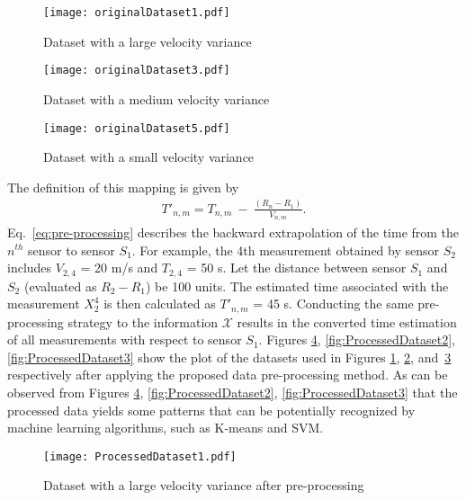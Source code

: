 \documentclass[letterpaper, 10 pt, conference]{ieeeconf}
\begin{document}
\begin{figure}[h!]
\centering
\captionsetup{justification=centering}
\texttt{[image: originalDataset1.pdf]}
\caption{Dataset with a large velocity variance}
\label{fig:firstDataset}
\end{figure}

\begin{figure}[h!]
\centering
\captionsetup{justification=centering}
\texttt{[image: originalDataset3.pdf]}
\caption{Dataset with a medium velocity variance}
\label{fig:secondDataset}
\end{figure}
\begin{figure}[h!]
\centering
\captionsetup{justification=centering}
\texttt{[image: originalDataset5.pdf]}
\caption{Dataset with a small velocity variance}
\label{fig:thirdDataset}
\end{figure}

The definition of this mapping is given by
\begin{align} \label{eq:pre-processing} 
{T'}_{n,m} =T_{n,m} ~-~ \frac{(R_n-R_1)}{V_{n,m}}.
\end{align}
Eq.~\ref{eq:pre-processing} describes the backward extrapolation of the time from the $n^{th}$ sensor to sensor $S_1$. For example, the 4th measurement obtained by sensor $S_2$ includes $V_{2,4}$ = 20 m/s and $T_{2,4}$ = 50 s. Let the distance between sensor $S_1$ and $S_2$ (evaluated as $R_2 - R_1$) be 100 units. The estimated time associated with the measurement $X_2^4$ is then calculated as ${T'}_{n,m}$ = 45 s. Conducting the same pre-processing strategy to the information $\mathcal{X}$ results in the converted time estimation of all measurements with respect to sensor $S_1$. Figures \ref{fig:ProcessedDataset1}, \ref{fig:ProcessedDataset2}, \ref{fig:ProcessedDataset3} show the plot of the datasets used in Figures \ref{fig:firstDataset}, \ref{fig:secondDataset}, and~\ref{fig:thirdDataset} respectively after applying the proposed data pre-processing method. As can be observed from Figures \ref{fig:ProcessedDataset1}, \ref{fig:ProcessedDataset2}, \ref{fig:ProcessedDataset3} that the processed data yields some patterns that can be potentially recognized by machine learning algorithms, such as K-means and SVM.


\begin{figure}[h!]
\centering
\captionsetup{justification=centering}
\texttt{[image: ProcessedDataset1.pdf]}
\caption{Dataset with a large velocity variance after pre-processing}
\label{fig:ProcessedDataset1}
\end{figure}
\end{document}
